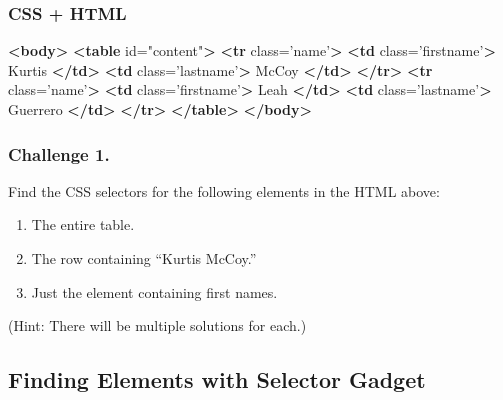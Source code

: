 \documentclass[
]{book}
\newenvironment{Shaded}{\begin{snugshade}}{\end{snugshade}}
\newcommand{\KeywordTok}[1]{\textcolor[rgb]{0.13,0.29,0.53}{\textbf{#1}}}
\newcommand{\NormalTok}[1]{#1}
\newcommand{\OtherTok}[1]{\textcolor[rgb]{0.56,0.35,0.01}{#1}}
\newcommand{\StringTok}[1]{\textcolor[rgb]{0.31,0.60,0.02}{#1}}
\providecommand{\tightlist}{%
  \setlength{\itemsep}{0pt}\setlength{\parskip}{0pt}}
\begin{document}
\hypertarget{css-html}{%
\subsubsection{CSS + HTML}\label{css-html}}

\begin{Shaded}
\begin{Highlighting}[]
\KeywordTok{<body>}
    \KeywordTok{<table}\OtherTok{ id=}\StringTok{"content"}\KeywordTok{>}
        \KeywordTok{<tr}\OtherTok{ class=}\StringTok{'name'}\KeywordTok{>}
            \KeywordTok{<td}\OtherTok{ class=}\StringTok{'firstname'}\KeywordTok{>}
\NormalTok{                Kurtis}
            \KeywordTok{</td>}
            \KeywordTok{<td}\OtherTok{ class=}\StringTok{'lastname'}\KeywordTok{>}
\NormalTok{                McCoy}
            \KeywordTok{</td>}
        \KeywordTok{</tr>}
        \KeywordTok{<tr}\OtherTok{ class=}\StringTok{'name'}\KeywordTok{>}
            \KeywordTok{<td}\OtherTok{ class=}\StringTok{'firstname'}\KeywordTok{>}
\NormalTok{                Leah}
            \KeywordTok{</td>}
            \KeywordTok{<td}\OtherTok{ class=}\StringTok{'lastname'}\KeywordTok{>}
\NormalTok{                Guerrero}
            \KeywordTok{</td>}
        \KeywordTok{</tr>}
    \KeywordTok{</table>}
\KeywordTok{</body>}
\end{Highlighting}
\end{Shaded}

\hypertarget{challenge-1.-16}{%
\subsubsection*{Challenge 1.}\label{challenge-1.-16}}

Find the CSS selectors for the following elements in the HTML above:

\begin{enumerate}
\def\labelenumi{\arabic{enumi}.}
\tightlist
\item
  The entire table.
\item
  The row containing ``Kurtis McCoy.''
\item
  Just the element containing first names.
\end{enumerate}

(Hint: There will be multiple solutions for each.)

\hypertarget{finding-elements-with-selector-gadget}{%
\subsection{Finding Elements with Selector Gadget}\label{finding-elements-with-selector-gadget}}
\end{document}
